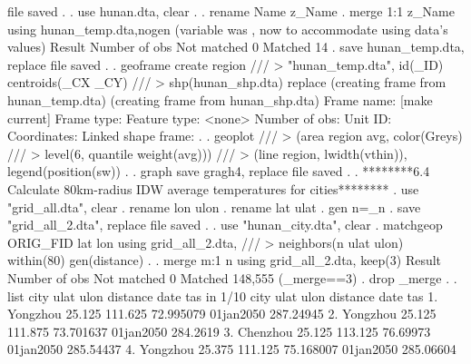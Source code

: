 file{} saved
{\smallskip}
. 
. use hunan.dta, clear
{\smallskip}
. 
. rename Name z_Name  
{\smallskip}
. merge 1:1 z_Name using hunan_temp.dta,nogen
(variable {} was {}, now {} to accommodate using data's values)
{\smallskip}
    Result                      Number of obs
    Not matched                             0
    Matched                                14  
{\smallskip}
. save hunan_temp.dta, replace
file{} saved
{\smallskip}
. 
. geoframe create region ///
>    "hunan_temp.dta", id(_ID) centroids(_CX _CY) ///
>     shp(hunan_shp.dta) replace
(creating frame {} from hunan_temp.dta)
(creating frame {} from hunan_shp.dta)
{\smallskip}
            Frame name: {} [make current]
            Frame type: {}
          Feature type: <none>
         Number of obs: {}
               Unit ID: {}
           Coordinates: {}
    Linked shape frame: {}
{\smallskip}
. 
. geoplot ///
>  (area region avg, color(Greys) ///
>                    level(6, quantile weight(avg))) ///
>  (line region, lwidth(vthin)), legend(position(sw))
{\smallskip}
. 
. graph save gragh4, replace
file {} saved
{\smallskip}
. 
. ********6.4 Calculate 80km-radius IDW average temperatures for cities********
. use "grid_all.dta", clear
{\smallskip}
. rename lon ulon
{\smallskip}
. rename lat ulat
{\smallskip}
. gen n=_n
{\smallskip}
. save "grid_all_2.dta", replace
file{} saved
{\smallskip}
. 
. use "hunan_city.dta", clear
{\smallskip}
. matchgeop ORIG_FID lat lon using grid_all_2.dta, ///
>                      neighbors(n ulat ulon) within(80) gen(distance)
{\smallskip}
. 
. merge m:1 n using grid_all_2.dta, keep(3)
{\smallskip}
    Result                      Number of obs
    Not matched                             0
    Matched                           148,555  (_merge==3)
{\smallskip}
. drop _merge
{\smallskip}
. 
. list city ulat ulon distance date tas in 1/10
{\smallskip}
     {\TLC}
     {\VBAR}     city     ulat      ulon    distance        date         tas {\VBAR}
     {\LFTT}
  1. {\VBAR} Yongzhou   25.125   111.625   72.995079   01jan2050   287.24945 {\VBAR}
  2. {\VBAR} Yongzhou   25.125   111.875   73.701637   01jan2050    284.2619 {\VBAR}
  3. {\VBAR} Chenzhou   25.125   113.125    76.69973   01jan2050   285.54437 {\VBAR}
  4. {\VBAR} Yongzhou   25.375   111.125   75.168007   01jan2050   285.06604 {\VBAR}
